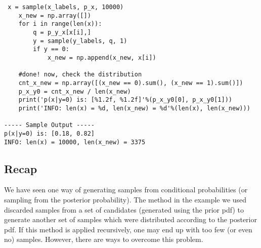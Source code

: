 \documentclass[11pt,onecolumn]{article}
\begin{document}
\begin{verbatim}
 x = sample(x_labels, p_x, 10000)
    x_new = np.array([])
    for i in range(len(x)):
        q = p_y_x[x[i],]
        y = sample(y_labels, q, 1)
        if y == 0:
            x_new = np.append(x_new, x[i])

    #done! now, check the distribution
    cnt_x_new = np.array([(x_new == 0).sum(), (x_new == 1).sum()])
    p_x_y0 = cnt_x_new / len(x_new)
    print('p(x|y=0) is: [%1.2f, %1.2f]'%(p_x_y0[0], p_x_y0[1]))
    print('INFO: len(x) = %d, len(x_new) = %d'%(len(x), len(x_new)))
    
----- Sample Output -----
p(x|y=0) is: [0.18, 0.82]
INFO: len(x) = 10000, len(x_new) = 3375

\end{verbatim}

\subsection{Recap}
We have seen one way of generating samples from conditional probabilities (or sampling from the posterior probability). The method in the example we used discarded samples from a set of candidates (generated using the prior pdf) to generate another set of samples which were distributed according to the posterior pdf. If this method is applied recursively, one may end up with too few (or even no) samples. However, there are ways to overcome this problem.
\end{document}
